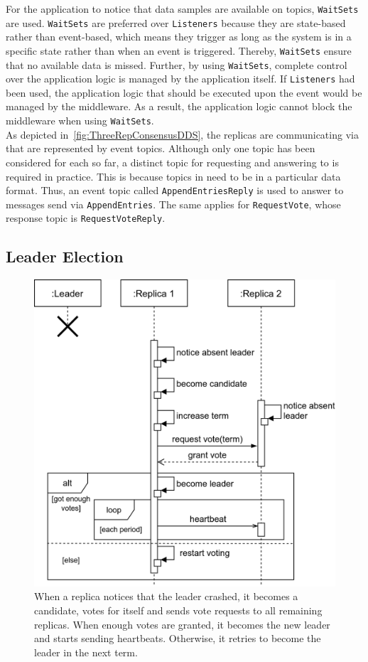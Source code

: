 For the application to notice that data samples are available on topics,  \texttt{WaitSets} are used.
\texttt{WaitSets} are preferred over  \texttt{Listeners} because they are state-based rather than event-based, which means they trigger as long as the system is in a specific state rather than when an event is triggered.
Thereby, \texttt{WaitSets} ensure that no available data is missed.
Further, by using \texttt{WaitSets}, complete control over the application logic is managed by the application itself.
If \texttt{Listeners} had been used, the application logic that should be executed upon the event would be managed by the middleware.
As a result, the application logic cannot block the middleware when using \texttt{WaitSets}.
\\

As depicted in~\autoref{fig:ThreeRepConsensusDDS}, the replicas are communicating via  that are represented by  event topics.
Although only one topic has been considered for each  so far, a distinct  topic for requesting and answering to  is required in practice.
This is because topics in  need to be in a particular data format.
Thus, an event topic called \texttt{AppendEntriesReply} is used to answer to messages send via \texttt{AppendEntries}.
The same applies for \texttt{RequestVote}, whose response topic is \texttt{RequestVoteReply}.


\subsection{Leader Election}
\begin{figure}[!hb]
	\centering
	\includegraphics[width=0.75\linewidth]{images/sequence/LeaderElection}
	\caption{When a replica notices that the leader crashed, it becomes a candidate, votes for itself and sends vote requests to all remaining replicas. When enough votes are granted, it becomes the new leader and starts sending heartbeats. Otherwise, it retries to become the leader in the next term.}
	\label{fig:SeqLeaderElection}
\end{figure}

